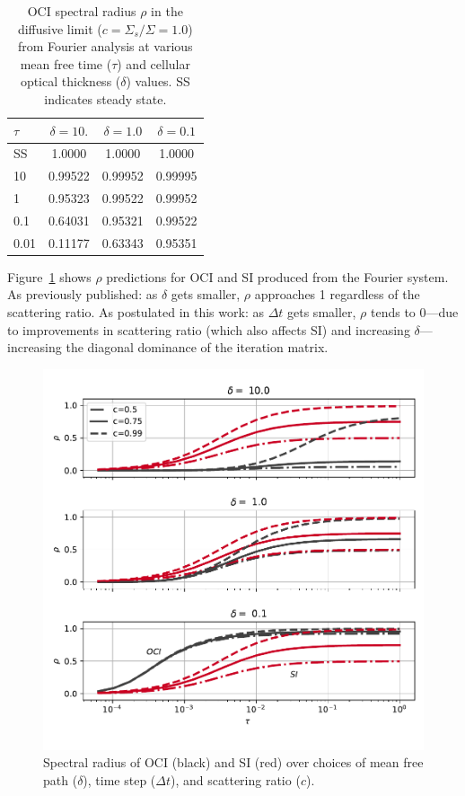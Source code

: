 \begin{table}
  \centering
  \begin{tabular}{@{}l c c c @{}} \toprule
    $\tau$ & $\delta=10.$ & $\delta=1.0$ & $\delta=0.1$ \\ \midrule
    SS  & \num{1.0000} & \num{1.0000} & \num{1.0000} \\
    10 & \num{0.99522} & \num{0.99952} & \num{0.99995} \\
    1  & \num{0.95323} & \num{0.99522} & \num{0.99952} \\
    0.1   & \num{0.64031} & \num{0.95321} & \num{0.99522} \\
    0.01 & \num{0.11177} & \num{0.63343} & \num{0.95351} \\
    \bottomrule
  \end{tabular}
  \caption{OCI spectral radius $\rho$ in the diffusive limit ($c=\Sigma_s/\Sigma =1.0$) from Fourier analysis at various mean free time ($\tau$) and cellular optical thickness ($\delta$) values. SS indicates steady state.} 
  \label{table:difflimit} 
\end{table}

Figure~\ref{fig:specrad_fa} shows $\rho$ predictions for OCI and SI produced from the Fourier system.
As previously published: as $\delta$ gets smaller, $\rho$ approaches 1 regardless of the scattering ratio.
As postulated in this work: as $\Delta t$ gets smaller, $\rho$ tends to 0---due to improvements in scattering ratio (which also affects SI) and increasing $\delta$---increasing the diagonal dominance of the iteration matrix.

\begin{figure}
    \centering
    \includegraphics[width=\textwidth]{figures/therefore_figs/spec_rad_over_dt.pdf}
    \caption{Spectral radius of OCI (black) and SI (red) over choices of mean free path ($\delta$), time step ($\Delta t$), and scattering ratio ($c$).}
    \label{fig:specrad_fa}
\end{figure}

